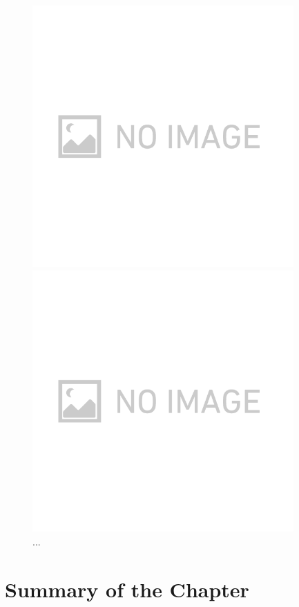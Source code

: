 \begin{figure}[p]
  \begin{minipage}{0.65\hsize}  
    \begin{center}   
      \includegraphics[width=10.0cm]{./img_chap3/img319.png}
      \caption{...}\label{img:img319}
    \end{center}
  \end{minipage}
  \begin{minipage}{0.65\hsize}  
    \begin{center}   
      \includegraphics[width=10.0cm]{./img_chap3/img320.png}
      \caption{...}\label{img:img320}
    \end{center}
  \end{minipage}    
\end{figure}



\section{Summary of the Chapter}
